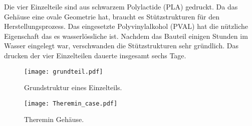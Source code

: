 Die vier Einzelteile sind aus schwarzem Polylactide (PLA)  gedruckt. Da das Gehäuse eine ovale Geometrie hat, braucht es Stützstrukturen für den Herstellungsprozess. Das eingesetzte Polyvinylalkohol (PVAL) hat die nützliche Eigenschaft das es  wasserlössliche ist. Nachdem das Bauteil einigen Stunden im Wasser eingelegt war, verschwanden die Stützstrukturen sehr gründlich. 
Das drucken der vier Einzelteilen dauerte insgesamt sechs Tage.
\begin{figure}[h]
	\centering
	\texttt{[image: grundteil.pdf]}
	\caption{Grundstruktur eines Einzelteils.}
	\label{img:grundteil}
\end{figure}
\begin{figure}[h]
	\centering
	\texttt{[image: Theremin\_case.pdf]}
	\caption{Theremin Gehäuse.}
	\label{img:Theremin_case}
\end{figure}




